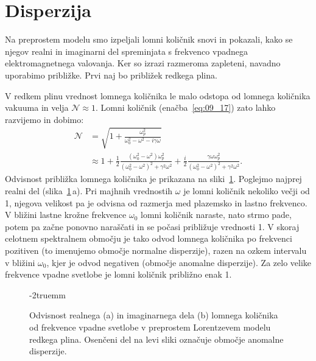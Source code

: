 \section{Disperzija}
\label{chap:disperzija}
Na preprostem modelu smo izpeljali lomni količnik snovi in pokazali,
kako se njegov realni in imaginarni del
spreminjata s frekvenco vpadnega elektromagnetnega valovanja. Ker so izrazi
razmeroma zapleteni, navadno uporabimo približke. Prvi naj 
bo približek redkega plina.

V redkem plinu vrednost lomnega količnika le malo odstopa od lomnega količnika vakuuma 
in velja $\mathcal{N} \approx 1$. Lomni količnik (enačba~\ref{eq:09_17}) 
zato lahko razvijemo in dobimo:
\begin{align}
\mathcal{N} &= \sqrt{1+ \frac{\omega_p^2}{\omega_0^2 - \omega^2 - i\gamma \omega}} \\
&\approx 1 + \frac{1}{2}\frac{\left(\omega_0^2 - \omega^2\right)\omega_p^2}{\left(\omega_0^2 - 
\omega^2\right)^2 + \gamma^2 \omega^2} + \frac{i}{2}\frac{\gamma \omega \omega_p^2}{\left(\omega_0^2 - 
\omega^2\right)^2 + \gamma^2 \omega^2}.
\label{eq:09_22}
\end{align}
Odvisnost približka lomnega količnika je prikazana na sliki~\ref{fig:09_nkompleks}.
Poglejmo najprej realni del (slika~\ref{fig:09_nkompleks}\,a). 
Pri majhnih vrednostih $\omega$ je lomni količnik nekoliko večji od 1, 
njegova velikost pa je odvisna od razmerja med plazemsko in lastno frekvenco.
V bližini lastne krožne frekvence $\omega_0$ lomni količnik naraste, nato strmo pade, potem pa 
začne ponovno naraščati in se počasi približuje vrednosti 1. V skoraj celotnem 
spektralnem območju je tako odvod lomnega količnika po frekvenci pozitiven 
(to imenujemo območje normalne disperzije),
razen na ozkem intervalu v bližini  $\omega_0$, kjer je odvod negativen (območje anomalne 
disperzije).
Za zelo velike frekvence vpadne svetlobe je lomni količnik približno enak 1.
\begin{figure}[ht!]
\centering
\def\svgwidth{140truemm} 

\caption{Odvisnost realnega (a) in imaginarnega dela (b) lomnega količnika od 
frekvence vpadne svetlobe v preprostem Lorentzevem modelu redkega plina. Osenčeni del na levi 
sliki označuje območje anomalne disperzije.}
\label{fig:09_nkompleks}
\vglue-2truemm
\end{figure}

